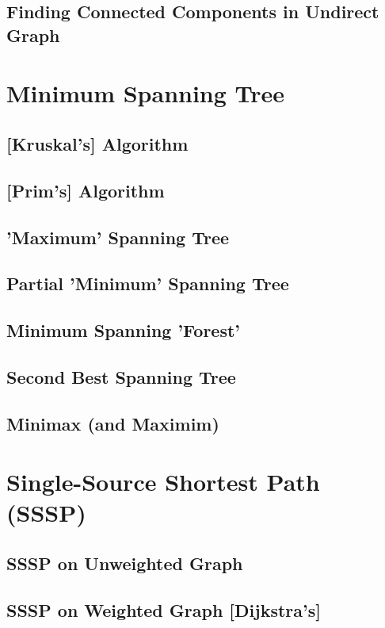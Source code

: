 	\subsection {Finding Connected Components in Undirect Graph}
		
\section {Minimum Spanning Tree}
	\subsection {[Kruskal's] Algorithm}
	\subsection {[Prim's] Algorithm}
	\subsection {'Maximum' Spanning Tree}
	\subsection {Partial 'Minimum' Spanning Tree}
	\subsection {Minimum Spanning 'Forest'}
	\subsection {Second Best Spanning Tree}
	\subsection {Minimax (and Maximim)}
\section {Single-Source Shortest Path (SSSP)}
	\subsection {SSSP on Unweighted Graph}
		
	\subsection {SSSP on Weighted Graph [Dijkstra's]}
	  

